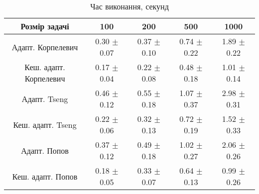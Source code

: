\begin{table}[H]
	\centering
	\begin{tabular}{|c||c|c|c|c|}\hline
		Розмір задачі & 100 & 200 & 500 & 1000 \\ \hline \hline
		Адапт. Корпелевич & 0.30 $\pm$ 0.07 & 0.37 $\pm$ 0.10 & 0.74 $\pm$ 0.22 & 1.89 $\pm$ 0.22 \\ \hline
		Кеш. адапт. Корпелевич & 0.17 $\pm$ 0.04 & 0.22 $\pm$ 0.08 & 0.48 $\pm$ 0.18 & 1.01 $\pm$ 0.14 \\ \hline
		Адапт. Tseng & 0.46 $\pm$ 0.12 & 0.55 $\pm$ 0.18 & 1.07 $\pm$ 0.37 & 2.98 $\pm$ 0.31 \\ \hline
		Кеш. адапт. Tseng & 0.22 $\pm$ 0.06 & 0.32 $\pm$ 0.13 & 0.72 $\pm$ 0.19 & 1.52 $\pm$ 0.33 \\ \hline
		Адапт. Попов & 0.37 $\pm$ 0.12 & 0.49 $\pm$ 0.18 & 1.02 $\pm$ 0.27 & 2.06 $\pm$ 0.26 \\ \hline
		Кеш. адапт. Попов & 0.18 $\pm$ 0.05 & 0.33 $\pm$ 0.07 & 0.64 $\pm$ 0.13 & 0.99 $\pm$ 0.26 \\ \hline
	\end{tabular}
	\caption{Час виконання, секунд}
\end{table}
